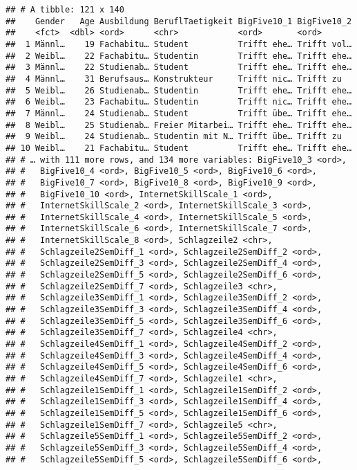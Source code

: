 \documentclass[]{article}
\begin{document}
\begin{verbatim}
## # A tibble: 121 x 140
##    Gender   Age Ausbildung BeruflTaetigkeit BigFive10_1 BigFive10_2
##    <fct>  <dbl> <ord>      <chr>            <ord>       <ord>      
##  1 Männl…    19 Fachabitu… Student          Trifft ehe… Trifft vol…
##  2 Weibl…    22 Fachabitu… Studentin        Trifft ehe… Trifft ehe…
##  3 Männl…    22 Studienab… Student          Trifft ehe… Trifft ehe…
##  4 Männl…    31 Berufsaus… Konstrukteur     Trifft nic… Trifft zu  
##  5 Weibl…    26 Studienab… Studentin        Trifft ehe… Trifft ehe…
##  6 Weibl…    23 Fachabitu… Studentin        Trifft nic… Trifft ehe…
##  7 Männl…    24 Studienab… Student          Trifft übe… Trifft ehe…
##  8 Weibl…    25 Studienab… Freier Mitarbei… Trifft ehe… Trifft ehe…
##  9 Weibl…    24 Studienab… Studentin mit N… Trifft übe… Trifft zu  
## 10 Weibl…    21 Fachabitu… Student          Trifft ehe… Trifft ehe…
## # … with 111 more rows, and 134 more variables: BigFive10_3 <ord>,
## #   BigFive10_4 <ord>, BigFive10_5 <ord>, BigFive10_6 <ord>,
## #   BigFive10_7 <ord>, BigFive10_8 <ord>, BigFive10_9 <ord>,
## #   BigFive10_10 <ord>, InternetSkillScale_1 <ord>,
## #   InternetSkillScale_2 <ord>, InternetSkillScale_3 <ord>,
## #   InternetSkillScale_4 <ord>, InternetSkillScale_5 <ord>,
## #   InternetSkillScale_6 <ord>, InternetSkillScale_7 <ord>,
## #   InternetSkillScale_8 <ord>, Schlagzeile2 <chr>,
## #   Schlagzeile2SemDiff_1 <ord>, Schlagzeile2SemDiff_2 <ord>,
## #   Schlagzeile2SemDiff_3 <ord>, Schlagzeile2SemDiff_4 <ord>,
## #   Schlagzeile2SemDiff_5 <ord>, Schlagzeile2SemDiff_6 <ord>,
## #   Schlagzeile2SemDiff_7 <ord>, Schlagzeile3 <chr>,
## #   Schlagzeile3SemDiff_1 <ord>, Schlagzeile3SemDiff_2 <ord>,
## #   Schlagzeile3SemDiff_3 <ord>, Schlagzeile3SemDiff_4 <ord>,
## #   Schlagzeile3SemDiff_5 <ord>, Schlagzeile3SemDiff_6 <ord>,
## #   Schlagzeile3SemDiff_7 <ord>, Schlagzeile4 <chr>,
## #   Schlagzeile4SemDiff_1 <ord>, Schlagzeile4SemDiff_2 <ord>,
## #   Schlagzeile4SemDiff_3 <ord>, Schlagzeile4SemDiff_4 <ord>,
## #   Schlagzeile4SemDiff_5 <ord>, Schlagzeile4SemDiff_6 <ord>,
## #   Schlagzeile4SemDiff_7 <ord>, Schlagzeile1 <chr>,
## #   Schlagzeile1SemDiff_1 <ord>, Schlagzeile1SemDiff_2 <ord>,
## #   Schlagzeile1SemDiff_3 <ord>, Schlagzeile1SemDiff_4 <ord>,
## #   Schlagzeile1SemDiff_5 <ord>, Schlagzeile1SemDiff_6 <ord>,
## #   Schlagzeile1SemDiff_7 <ord>, Schlagzeile5 <chr>,
## #   Schlagzeile5SemDiff_1 <ord>, Schlagzeile5SemDiff_2 <ord>,
## #   Schlagzeile5SemDiff_3 <ord>, Schlagzeile5SemDiff_4 <ord>,
## #   Schlagzeile5SemDiff_5 <ord>, Schlagzeile5SemDiff_6 <ord>,

\end{verbatim}
\end{document}
